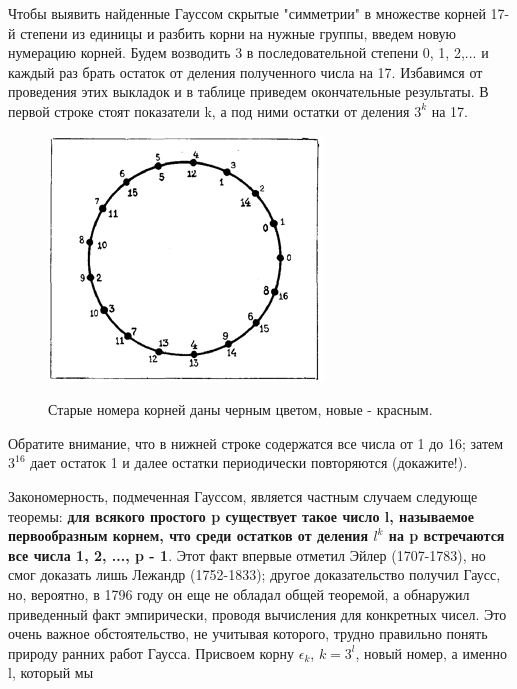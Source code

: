 Чтобы выявить найденные Гауссом скрытые "симметрии" в множестве корней 17-й степени из единицы и разбить корни на нужные группы, введем новую нумерацию корней. Будем возводить 3 в последовательной степени 0, 1, 2,... и каждый раз брать остаток от деления полученного числа на 17. Избавимся от проведения этих выкладок и в таблице приведем окончательные результаты. В первой строке стоят показатели k, а под ними остатки от деления $3^{k}$ на 17. \\
\begin{figure}[t]
    \setcounter{figure}{6}
    \includegraphics[width = \columnwidth]{2.png}
    \label{fig:17_angle}
    \caption{Старые номера корней даны черным цветом, новые - красным.}
\end{figure}
Обратите внимание, что в нижней строке содержатся все числа от 1 до 16; затем $3^{16}$ дает остаток 1 и далее остатки периодически повторяются (докажите!).

Закономерность, подмеченная Гауссом, является частным случаем следующе теоремы: \textbf{для всякого простого p существует такое число l, называемое первообразным корнем, что среди остатков от деления $l^k$ на p встречаются все числа 1, 2, ..., p - 1}. Этот факт впервые отметил Эйлер (1707-1783), но смог доказать лишь Лежандр (1752-1833); другое доказательство получил Гаусс, но, вероятно, в 1796 году он еще не обладал общей теоремой, а обнаружил приведенный факт эмпирически, проводя вычисления для конкретных чисел. Это очень важное обстоятельство, не учитывая которого, трудно правильно понять природу ранних работ Гаусса.
Присвоем корну $\epsilon_k$, $k=3^l$, новый номер, а именно l, который мы

